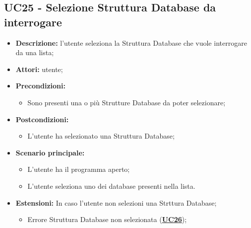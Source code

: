 \subsection{UC25 - Selezione Struttura Database da interrogare}
\label{sec:UC25}
\begin{itemize}
	\item \textbf{Descrizione:} l’utente seleziona la Struttura Database che vuole interrogare da una lista;
	\item \textbf{Attori:} utente;
	\item \textbf{Precondizioni:}
	\begin{itemize}
		\item Sono presenti una o più Strutture Database da poter selezionare;
	\end{itemize}
	\item \textbf{Postcondizioni:}
	\begin{itemize}
		\item L’utente ha selezionato una Struttura Database;
	\end{itemize}
	\item \textbf{Scenario principale:}
	\begin{itemize}
		\item L’utente ha il programma aperto;
		\item L’utente seleziona uno dei database presenti nella lista.
	\end{itemize}
	\item \textbf{Estensioni:} In caso l'utente non selezioni una Strttura Database;
	\begin{itemize}
		\item Errore Struttura Database non selezionata (\hyperref[sec:UC26]{\textbf{UC26}});
	\end{itemize}
\end{itemize}

